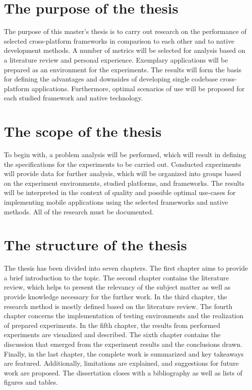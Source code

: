 \section{The purpose of the thesis}

The purpose of this master's thesis is to carry out research on the performance of selected cross-platform frameworks in comparison to each other and to native development methods. A number of metrics will be selected for analysis based on a literature review and personal experience. Exemplary applications will be prepared as an environment for the experiments. The results will form the basis for defining the advantages and downsides of developing single codebase cross-platform applications. Furthermore, optimal scenarios of use will be proposed for each studied framework and native technology.

\section{The scope of the thesis}

To begin with, a problem analysis will be performed, which will result in defining the specifications for the experiments to be carried out. Conducted experiments will provide data for further analysis, which will be organized into groups based on the experiment environments, studied platforms, and frameworks. The results will be interpreted in the context of quality and possible optimal use-cases for implementing mobile applications using the selected frameworks and native methods. All of the research must be documented.

\section{The structure of the thesis}

The thesis has been divided into seven chapters. The first chapter aims to provide a brief introduction to the topic. The second chapter contains the literature review, which helps to present the relevancy of the subject matter as well as provide knowledge necessary for the further work. In the third chapter, the research method is mostly defined based on the literature review. The fourth chapter concerns the implementation of testing environments and the realization of prepared experiments. In the fifth chapter, the results from performed experiments are visualized and described. The sixth chapter contains the discussion that emerged from the experiment results and the conclusions drawn. Finally, in the last chapter, the complete work is summarized and key takeaways are featured. Additionally, limitations are explained, and suggestions for future work are proposed. The dissertation closes with a bibliography as well as lists of figures and tables.
